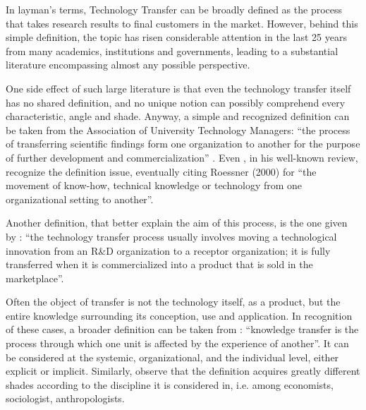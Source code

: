 

\label{Chapter1} %


In layman's terms, Technology Transfer can be broadly defined as the process that takes research results to final customers in the market. However, behind this simple definition, the topic has risen considerable attention in the last 25 years from many academics, institutions and governments, leading to a substantial literature encompassing almost any possible perspective.

One side effect of such large literature is that even the technology transfer itself has no shared definition, and no unique notion can possibly comprehend every characteristic, angle and shade. Anyway, a simple and recognized definition can be taken from the Association of University Technology Managers: \enquote{the process of transferring scientific findings form one organization to another for the purpose of further development and commercialization} \citep{Genshaft2016}. Even \citet{Bozeman2000}, in his well-known review, recognize the definition issue, eventually citing Roessner (2000) for \enquote{the movement of know-how, technical knowledge or technology from one organizational setting to another}. 

Another definition, that better explain the aim of this process, is the one given by \citet{Rogers2001}: \enquote{the technology transfer process usually involves moving a technological innovation from an R\&D organization to a receptor organization; it is fully transferred when it is commercialized into a product that is sold in the marketplace}. 

Often the object of transfer is not the technology itself, as a product, but the entire knowledge surrounding its conception, use and application. In recognition of these cases, a broader definition can be taken from \citet{Argote2000}: \enquote{knowledge transfer is the process through which one unit is affected by the experience of another}. It can be considered at the systemic, organizational, and the individual level, either explicit or implicit. Similarly, \citet{Zhao1992} observe that the definition acquires greatly different shades according to the discipline it is considered in, i.e. among economists, sociologist, anthropologists. 

